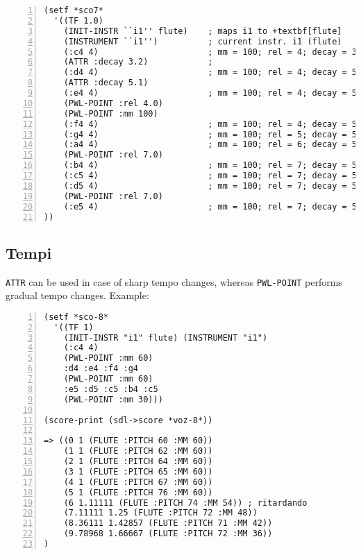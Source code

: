 \begin{Verbatim}[frame=single,fontsize=\small,numbers=left,numbersep=2mm,
                 commandchars=+\[\]]
(setf *sco7*
  '((TF 1.0)                        
    (INIT-INSTR ``i1'' flute)    ; maps i1 to +textbf[flute]
    (INSTRUMENT ``i1'')          ; current instr. i1 (flute)
    (:c4 4)                      ; mm = 100; rel = 4; decay = 3.2 
    (ATTR :decay 3.2)            ;
    (:d4 4)                      ; mm = 100; rel = 4; decay = 5.1
    (ATTR :decay 5.1)         
    (:e4 4)                      ; mm = 100; rel = 4; decay = 5.1
    (PWL-POINT :rel 4.0)         
    (PWL-POINT :mm 100)
    (:f4 4)                      ; mm = 100; rel = 4; decay = 5.1
    (:g4 4)                      ; mm = 100; rel = 5; decay = 5.1
    (:a4 4)                      ; mm = 100; rel = 6; decay = 5.1
    (PWL-POINT :rel 7.0)
    (:b4 4)                      ; mm = 100; rel = 7; decay = 5.1
    (:c5 4)                      ; mm = 100; rel = 7; decay = 5.1
    (:d5 4)                      ; mm = 100; rel = 7; decay = 5.1
    (PWL-POINT :rel 7.0)
    (:e5 4)                      ; mm = 100; rel = 7; decay = 5.1
))
\end{Verbatim}


\subsection{Tempi}
\texttt{ATTR} can be used in case of sharp tempo changes, whereas \texttt{PWL-POINT} performs gradual tempo changes. Example:
\begin{Verbatim}[frame=single,fontsize=\small,numbers=left,numbersep=2mm,
                 commandchars=+\[\]]
(setf *sco-8* 
  '((TF 1) 
    (INIT-INSTR "i1" flute) (INSTRUMENT "i1")
    (:c4 4)
    (PWL-POINT :mm 60)
    :d4 :e4 :f4 :g4
    (PWL-POINT :mm 60)
    :e5 :d5 :c5 :b4 :c5
    (PWL-POINT :mm 30)))

(score-print (sdl->score *voz-8*))

=> ((0 1 (FLUTE :PITCH 60 :MM 60))
    (1 1 (FLUTE :PITCH 62 :MM 60))
    (2 1 (FLUTE :PITCH 64 :MM 60))
    (3 1 (FLUTE :PITCH 65 :MM 60))
    (4 1 (FLUTE :PITCH 67 :MM 60))
    (5 1 (FLUTE :PITCH 76 :MM 60))
    (6 1.11111 (FLUTE :PITCH 74 :MM 54)) ; ritardando
    (7.11111 1.25 (FLUTE :PITCH 72 :MM 48))
    (8.36111 1.42857 (FLUTE :PITCH 71 :MM 42))
    (9.78968 1.66667 (FLUTE :PITCH 72 :MM 36))
)
\end{Verbatim}
